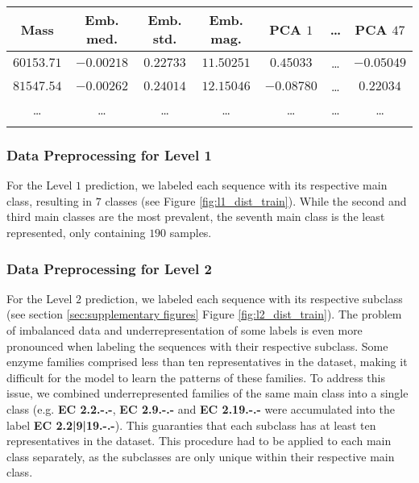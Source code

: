 \documentclass{bioinfo}
\begin{document}
\begin{methods}
\begin{table}[!htbp]
\setlength{\tabcolsep}{2pt}
 {
	\begin{tabular}{@{}ccccccc@{}}
		\toprule 
		Mass & Emb. med. & Emb. std. & Emb. mag. & PCA $1$ & \dots & PCA $47$\\
		\midrule
		$60153.71$ & $-0.00218$ & $0.22733$ & $11.50251$ & $0.45033$ & \dots & $-0.05049$\\
		$81547.54$ & $-0.00262$ & $0.24014$ & $12.15046$ & $-0.08780$ & \dots & $0.22034$ \\
		\dots & \dots & \dots & \dots & \dots & \dots & \dots \\
		\botrule
    \end{tabular}
}{}
\end{table}

\subsubsection{Data Preprocessing for Level 1}
For the Level $1$ prediction, we labeled each sequence with its respective main class,
resulting in $7$ classes (see Figure \ref{fig:l1_dist_train}).
While the second and third main classes are the most prevalent, 
the seventh main class is the least represented, only
containing $190$ samples. 

\subsubsection{Data Preprocessing for Level 2}
For the Level $2$ prediction, we labeled each sequence with its respective subclass (see section \ref{sec:supplementary figures} Figure \ref{fig:l2_dist_train}).
The problem of imbalanced data and underrepresentation of some labels is even more pronounced when labeling the sequences with their respective subclass.
Some enzyme families comprised less than ten representatives in the dataset, making it difficult for the model to learn the patterns of these families.
To address this issue, we combined underrepresented families of the same main class into a single class 
(e.g. \textbf{EC 2.2.-.-}, \textbf{EC 2.9.-.-} and \textbf{EC 2.19.-.-} were accumulated into the label \textbf{EC 2.2|9|19.-.-}).
This guaranties that each subclass has at least ten representatives in the dataset.
This procedure had to be applied to each main class separately, as the subclasses are only unique within their respective main class.


\end{methods}
\end{document}
